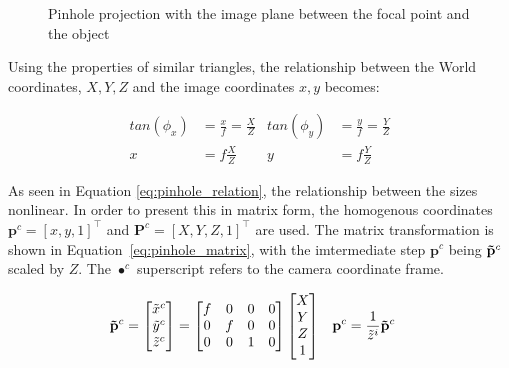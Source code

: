 \begin{figure}[!htb]

    \caption{Pinhole projection with the image plane between the focal point and the object}
    \label{fig:pinhole}
    
\end{figure}

Using the properties of similar triangles, the relationship between the World coordinates, $X,Y,Z$ and the image coordinates $x,y$ becomes:

\begin{align}
    tan(\phi_x) &= \frac{x}{f} = \frac{X}{Z} & tan(\phi_y) &= \frac{y}{f} = \frac{Y}{Z} \label{eq:pinhole_tan_relation} \\
    x &= f\frac{X}{Z} & y &=f\frac{Y}{Z}
    \label{eq:pinhole_relation}
\end{align}

As seen in Equation \eqref{eq:pinhole_relation}, the relationship between the sizes nonlinear. In order to present this in matrix form, the homogenous coordinates $\mathbf{p}^c=[x,y,1]^\top$ and $\mathbf{P}^c=[X,Y,Z,1]^\top$ are used. The matrix transformation is shown in Equation~\eqref{eq:pinhole_matrix}, with the imtermediate step $\mathbf{p}^c$ being $\mathbf{\Tilde{p}}^c$ scaled by $Z$. The $\bullet^c$ superscript refers to the camera coordinate frame.

\begin{align}
    \mathbf{\Tilde{p}}^c &= \begin{bmatrix}
        \Tilde{x}^c \\ \Tilde{y}^c \\ \Tilde{z}^c
    \end{bmatrix} = \begin{bmatrix}
        f & 0 & 0 & 0 \\
        0 & f & 0 & 0 \\
        0 & 0 & 1 & 0
    \end{bmatrix}\begin{bmatrix}
        X \\ Y \\ Z \\ 1
    \end{bmatrix} &
    \mathbf{p}^c &= \frac{1}{\Tilde{z}^i}\mathbf{\Tilde{p}}^c
    \label{eq:pinhole_matrix}
\end{align}

